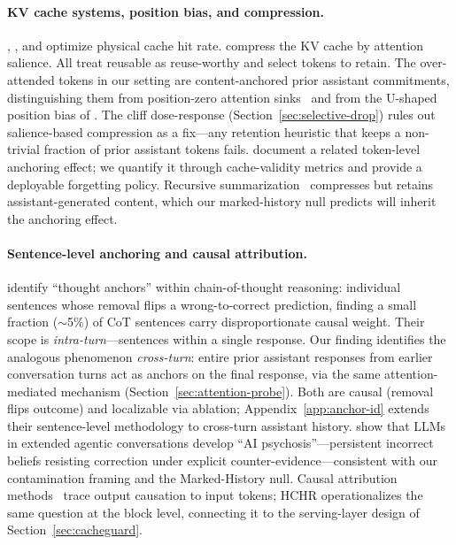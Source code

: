 \documentclass{article}
\begin{document}
\paragraph{KV cache systems, position bias, and compression.}
\citet{kwon2023vllm}, \citet{zheng2024sglang}, and \citet{liu2025lmcache} optimize physical cache hit rate. \citet{zhang2023h2o,xiao2024streamingllm,li2024snapkv} compress the KV cache by attention salience. All treat reusable as reuse-worthy and select tokens to retain. The over-attended tokens in our setting are content-anchored prior assistant commitments, distinguishing them from position-zero attention sinks~\citep{xiao2024streamingllm,sun2025attentionsink} and from the U-shaped position bias of \citet{liu2023lostmiddle}. The cliff dose-response (Section~\ref{sec:selective-drop}) rules out salience-based compression as a fix---any retention heuristic that keeps a non-trivial fraction of prior assistant tokens fails. \citet{contextualdrag2026} document a related token-level anchoring effect; we quantify it through cache-validity metrics and provide a deployable forgetting policy. Recursive summarization~\citep{wu2023recursivesumm} compresses but retains assistant-generated content, which our marked-history null predicts will inherit the anchoring effect.

\paragraph{Sentence-level anchoring and causal attribution.}
\citet{thoughtanchors2025} identify ``thought anchors'' within chain-of-thought reasoning: individual sentences whose removal flips a wrong-to-correct prediction, finding a small fraction ($\sim$5\%) of CoT sentences carry disproportionate causal weight. Their scope is \emph{intra-turn}---sentences within a single response. Our finding identifies the analogous phenomenon \emph{cross-turn}: entire prior assistant responses from earlier conversation turns act as anchors on the final response, via the same attention-mediated mechanism (Section~\ref{sec:attention-probe}). Both are causal (removal flips outcome) and localizable via ablation; Appendix~\ref{app:anchor-id} extends their sentence-level methodology to cross-turn assistant history. \citet{aipsychosis2026} show that LLMs in extended agentic conversations develop ``AI psychosis''---persistent incorrect beliefs resisting correction under explicit counter-evidence---consistent with our contamination framing and the Marked-History null. Causal attribution methods~\citep{gradienttracing2025} trace output causation to input tokens; HCHR operationalizes the same question at the block level, connecting it to the serving-layer design of Section~\ref{sec:cacheguard}.
\end{document}
